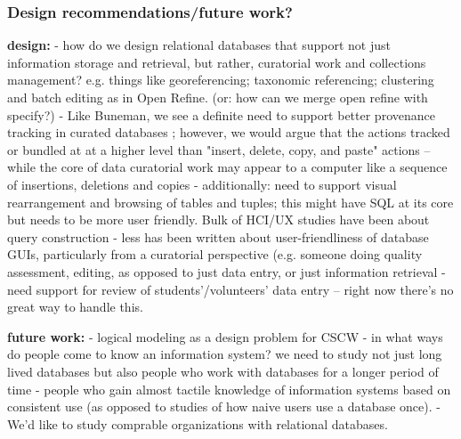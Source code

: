 \subsubsection{Design recommendations/future work?}

\textbf{design: }
- how do we design relational databases that support not just information storage and retrieval, but rather,  curatorial work and collections management? e.g. things like georeferencing; taxonomic referencing; clustering and batch editing as in Open Refine. (or: how can we merge open refine with specify?)
- Like Buneman, we see a definite need to support better provenance tracking in curated databases \cite{Buneman_2006}; however, we would argue that the actions tracked or bundled at at a higher level than "insert, delete, copy, and paste" actions -- while the core of data curatorial work may appear to a computer like a sequence of insertions, deletions and copies
- additionally: need to support visual rearrangement and browsing of tables and tuples; this might have SQL at its core but needs to be more user friendly. Bulk of HCI/UX studies have been about query construction - less has been written about user-friendliness of database GUIs, particularly from a curatorial perspective (e.g. someone doing quality assessment, editing, as opposed to just data entry, or just information retrieval
- need support for review of students'/volunteers' data entry  -- right now there's no great way to handle this.

\textbf{future work:}
- logical modeling as a design problem for CSCW
- in what ways do people come to know an information system? we need to study not just long lived databases but also people who work with databases for a longer period of time - people who gain almost tactile knowledge of information systems based on consistent use (as opposed to studies of how naive users use a database once).
- We'd like to study comprable organizations with relational databases.